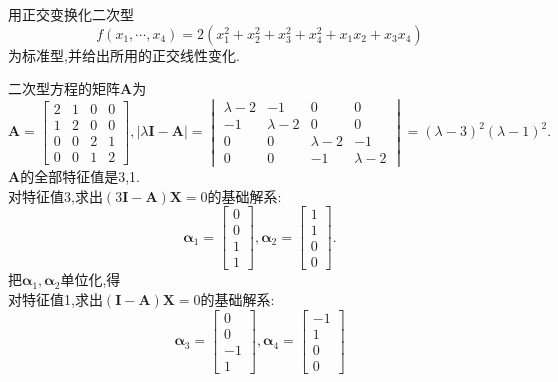 \documentclass[lang=cn,11pt,normal]{elegantbook}
\renewcommand{\AA}{\boldsymbol{A}}
\newcommand{\XX}{\boldsymbol{X}}
\newcommand{\II}{\boldsymbol{I}}
\begin{document}
	\begin{exercise}
		用正交变换化二次型
		\begin{equation}
		f(x_1,\cdots,x_4)=2(x_1^2+x_2^2+x_3^2+x_4^2+x_1x_2+x_3x_4)
		\end{equation}
		为标准型,并给出所用的正交线性变化.
	\end{exercise}
	\begin{solution}
		二次型方程的矩阵$\AA$为
		\begin{equation}
		\AA=
		\begin{bmatrix}
		2&1&0&0\\
		1&2&0&0\\
		0&0&2&1\\
		0&0&1&2
		\end{bmatrix},
		|\lambda\II-\AA|=
		\begin{vmatrix}
		\lambda-2&-1&0&0\\
		-1&\lambda-2&0&0\\
		0&0&\lambda-2&-1\\
		0&0&-1&\lambda-2
		\end{vmatrix}
		=(\lambda-3)^2(\lambda-1)^2.
		\end{equation}
		$\AA$的全部特征值是3,1.\\
		对特征值3,求出$(3\II-\AA)\XX=0$的基础解系:
		\begin{equation}
		\boldsymbol{\alpha}_1=
		\begin{bmatrix}
		0\\0\\1\\1
		\end{bmatrix},
		\boldsymbol{\alpha}_2=
		\begin{bmatrix}
		1\\1\\0\\0
		\end{bmatrix}.
		\end{equation}
		把$\boldsymbol{\alpha}_1,\boldsymbol{\alpha}_2$单位化,得\\
		对特征值1,求出$(\II-\AA)\XX=0$的基础解系:
		\begin{equation}
		\boldsymbol{\alpha}_3=
		\begin{bmatrix}
		0\\0\\-1\\1
		\end{bmatrix},
		\boldsymbol{\alpha}_4=
		\begin{bmatrix}
		-1\\1\\0\\0

\end{bmatrix}
\end{equation}
\end{solution}
\end{document}
